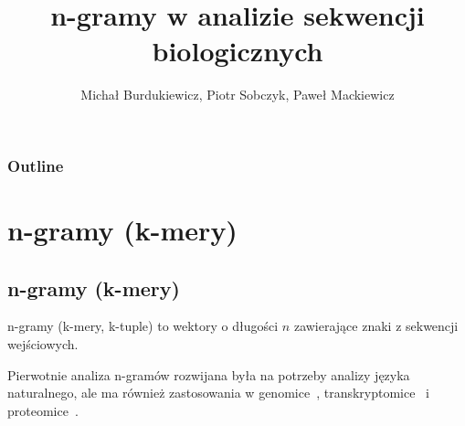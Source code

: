 \documentclass[10pt]{beamer}\usepackage[]{graphicx}\usepackage[]{color}
\begin{document}
\date{}
\author{Michał  Burdukiewicz, Piotr Sobczyk, Paweł Mackiewicz}

\title{n-gramy w analizie sekwencji biologicznych}

\begin{frame}
\maketitle
\end{frame}

\begin{frame}
\frametitle{Outline}
\tableofcontents
\end{frame}






\section{n-gramy (k-mery)}

\subsection{n-gramy (k-mery)}


\begin{frame}
n-gramy (k-mery, k-tuple) to wektory o długości $n$ zawierające znaki z sekwencji wejściowych.

\vspace{2cm}

Pierwotnie analiza n-gramów rozwijana była na potrzeby analizy języka naturalnego, ale ma również zastosowania w genomice~\citep{fang2011}, transkryptomice~\citep{wang2014} i proteomice~\citep{guo2014}.

\end{frame}
\end{document}
